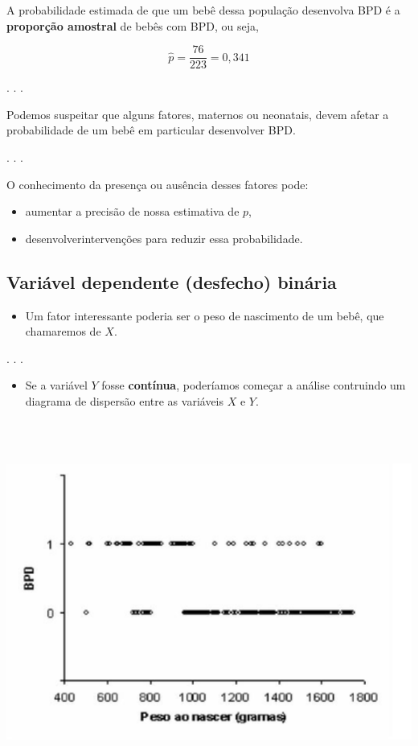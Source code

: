 \documentclass[
  letterpaper,
  DIV=11,
  numbers=noendperiod]{scrartcl}
\providecommand{\tightlist}{%
  \setlength{\itemsep}{0pt}\setlength{\parskip}{0pt}}\usepackage{longtable,booktabs,array}
\begin{document}
A probabilidade estimada de que um bebê dessa população desenvolva BPD é
a \textbf{proporção amostral} de bebês com BPD, ou seja,

\[\hat{p} = \dfrac{76}{223} = 0,341\]

. . .

Podemos suspeitar que alguns fatores, maternos ou neonatais, devem
afetar a probabilidade de um bebê em particular desenvolver BPD.

. . .

O conhecimento da presença ou ausência desses fatores pode:

\begin{itemize}
\item
  aumentar a precisão de nossa estimativa de \(p\),
\item
  desenvolverintervenções para reduzir essa probabilidade.
\end{itemize}

\subsection{Variável dependente (desfecho)
binária}\label{variuxe1vel-dependente-desfecho-binuxe1ria-4}

\begin{itemize}
\tightlist
\item
  Um fator interessante poderia ser o peso de nascimento de um bebê, que
  chamaremos de \(X\).
\end{itemize}

. . .

\begin{itemize}
\tightlist
\item
  Se a variável \(Y\) fosse \textbf{contínua}, poderíamos começar a
  análise contruindo um diagrama de dispersão entre as variáveis \(X\) e
  \(Y\).
\end{itemize}

\includegraphics[width=6.25in,height=4.6875in]{../../images/BPD_disp.png}
\end{document}
